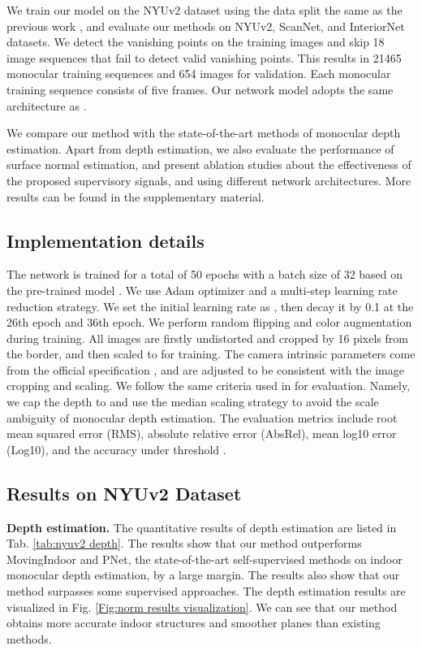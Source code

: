 \documentclass[10pt,twocolumn,letterpaper]{article}
\newcommand{\Fig}[1]{Fig. \ref{#1}}
\newcommand{\Tab}[1]{Tab. \ref{#1}}
\begin{document}
We train our model on the NYUv2 dataset \cite{silberman2012indoor} using the data split the same as the previous work \cite{zhou2019moving}\cite{yu2020p}, and evaluate our methods on NYUv2\cite{silberman2012indoor}, ScanNet\cite{dai2017scannet}, and InteriorNet\cite{li2018interiornet} datasets.  We detect the vanishing points on the training images and skip 18 image sequences that fail to detect valid vanishing points. This results in 21465 monocular training sequences and 654 images for validation. Each monocular training sequence consists of five frames. Our network model adopts the same architecture as \cite{yu2020p}.

We compare our method with the state-of-the-art methods of monocular depth estimation. Apart from depth estimation, we also evaluate the performance of surface normal estimation, and present ablation studies about the effectiveness of the proposed supervisory signals, and using different network architectures. More results can be found in the supplementary material.

\subsection{Implementation details}
The network is trained for a total of 50 epochs with a batch size of 32 based on the pre-trained model \cite{yu2020p}. We use Adam optimizer and a multi-step learning rate reduction strategy. We set the initial learning rate as , then decay it by 0.1 at the 26th epoch and 36th epoch. We perform random flipping and color augmentation during training. All images are firstly undistorted and cropped by 16 pixels from the border, and then scaled to  for training. The camera intrinsic parameters come from the official specification \cite{silberman2012indoor}, and are adjusted to be consistent with the image cropping and scaling. We follow the same criteria used in \cite{godard2019digging,yu2020p}  for evaluation. Namely, we cap the depth to   and use the median scaling strategy to avoid the scale ambiguity of monocular depth estimation. The evaluation metrics include root mean squared error (RMS), absolute relative error (AbsRel), mean log10 error (Log10), and the accuracy under threshold .

\subsection{Results on NYUv2 Dataset}
\textbf{Depth estimation.} The quantitative results of depth estimation are listed in \Tab{tab:nyuv2 depth}. The results show that our method outperforms MovingIndoor\cite{zhou2019moving} and PNet\cite{yu2020p}, the state-of-the-art self-supervised methods on indoor monocular depth estimation, by a large margin. The results also show that our method surpasses some supervised approaches. The depth estimation results are visualized in \Fig{Fig:norm results visualization}. We can see that our method obtains more accurate indoor structures and smoother planes than existing methods.
\end{document}
